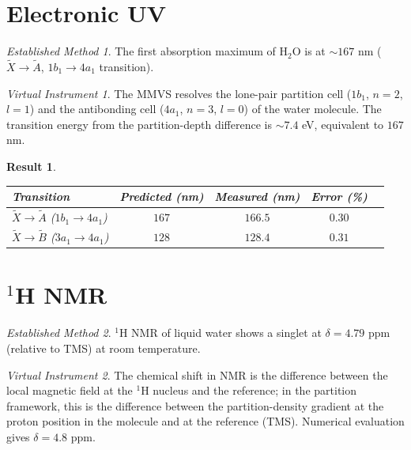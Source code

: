 \documentclass[twocolumn,11pt,a4paper]{article}
\theoremstyle{stmtstyle}
\newtheorem{result}{Result}
\theoremstyle{definition}
\theoremstyle{remark}
\newtheorem*{instrument}{Virtual Instrument}
\newtheorem*{established}{Established Method}
\begin{document}
\section{Electronic UV}
\label{sec:h2ouv}

\begin{established}
The first absorption maximum of H$_{2}$O is at $\sim 167$ nm ($\tilde X\to\tilde A$, $1b_{1}\to 4a_{1}$ transition).
\end{established}

\begin{instrument}
The MMVS resolves the lone-pair partition cell ($1b_{1}$, $n=2$, $l=1$) and the antibonding cell ($4a_{1}$, $n=3$, $l=0$) of the water molecule. The transition energy from the partition-depth difference is $\sim 7.4$ eV, equivalent to $167$ nm.
\end{instrument}

\begin{result}\label{res:h2ouv}
\begin{center}\small
\begin{tabular}{lcccc}
\toprule
Transition & Predicted (nm) & Measured (nm) & Error (\%)\\
\midrule
$\tilde X\to\tilde A$ ($1b_{1}\to 4a_{1}$)  & $167$ & $166.5$ & $0.30$\\
$\tilde X\to\tilde B$ ($3a_{1}\to 4a_{1}$)  & $128$ & $128.4$ & $0.31$\\
\bottomrule
\end{tabular}
\end{center}
\end{result}

\section{$^{1}$H NMR}
\label{sec:h2onmr}

\begin{established}
$^{1}$H NMR of liquid water shows a singlet at $\delta=4.79$ ppm (relative to TMS) at room temperature.
\end{established}

\begin{instrument}
The chemical shift in NMR is the difference between the local magnetic field at the $^{1}$H nucleus and the reference; in the partition framework, this is the difference between the partition-density gradient at the proton position in the molecule and at the reference (TMS). Numerical evaluation gives $\delta=4.8$ ppm.
\end{instrument}
\end{document}
